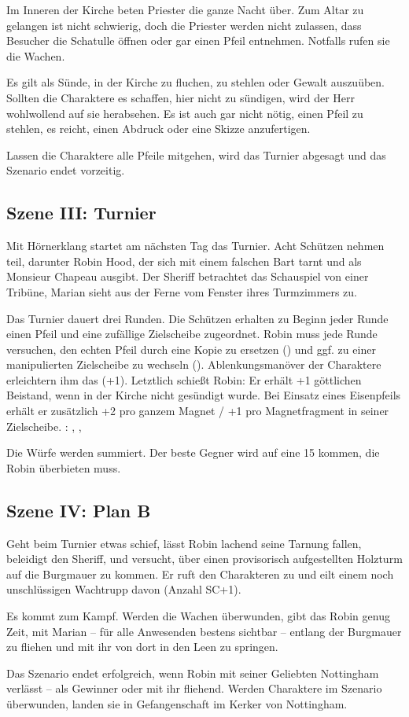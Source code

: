 {		Im Inneren der Kirche beten Priester die ganze Nacht über. Zum Altar zu gelangen ist nicht schwierig, doch die Priester werden nicht zulassen, dass Besucher die Schatulle öffnen oder gar einen Pfeil entnehmen. Notfalls rufen sie die Wachen.

		Es gilt als Sünde, in der Kirche zu fluchen, zu stehlen oder Gewalt auszuüben. Sollten die Charaktere es schaffen, hier nicht zu sündigen, wird der Herr wohlwollend auf sie herabsehen. Es ist auch gar nicht nötig, einen Pfeil zu stehlen, es reicht, einen Abdruck oder eine Skizze anzufertigen.

		Lassen die Charaktere alle Pfeile mitgehen, wird das Turnier abgesagt und das Szenario endet vorzeitig.

		\subsection{Szene III: Turnier}

		Mit Hörnerklang startet am nächsten Tag das Turnier. Acht Schützen nehmen teil, darunter Robin Hood, der sich mit einem falschen Bart tarnt und als Monsieur Chapeau ausgibt. Der Sheriff betrachtet das Schauspiel von einer Tribüne, Marian sieht aus der Ferne vom Fenster ihres Turmzimmers zu.

		Das Turnier dauert drei Runden. Die Schützen erhalten zu Beginn jeder Runde einen Pfeil und eine zufällige Zielscheibe zugeordnet. Robin muss jede Runde versuchen, den echten Pfeil durch eine Kopie zu ersetzen () und ggf. zu einer manipulierten Zielscheibe zu wechseln (). Ablenkungsmanöver der Charaktere erleichtern ihm das (+1). Letztlich schießt Robin: Er erhält +1 göttlichen Beistand, wenn in der Kirche nicht gesündigt wurde. Bei Einsatz eines Eisenpfeils erhält er zusätzlich +2 pro ganzem Magnet / +1 pro Magnetfragment in seiner Zielscheibe. : , , 

		Die Würfe werden summiert. Der beste Gegner wird auf eine 15 kommen, die Robin überbieten muss.

		\subsection{Szene IV: Plan B}

		Geht beim Turnier etwas schief, lässt Robin lachend seine Tarnung fallen, beleidigt den Sheriff, und versucht, über einen provisorisch aufgestellten Holzturm auf die Burgmauer zu kommen. Er ruft den Charakteren  zu und eilt einem noch unschlüssigen Wachtrupp davon (Anzahl SC+1).

		Es kommt zum Kampf. Werden die Wachen überwunden, gibt das Robin genug Zeit, mit Marian -- für alle Anwesenden bestens sichtbar -- entlang der Burgmauer zu fliehen und mit ihr von dort in den Leen zu springen.


		\noindent
		Das Szenario endet erfolgreich, wenn Robin mit seiner Geliebten Nottingham verlässt -- als Gewinner oder mit ihr fliehend. Werden Charaktere im Szenario überwunden, landen sie in Gefangenschaft im Kerker von Nottingham.
}
